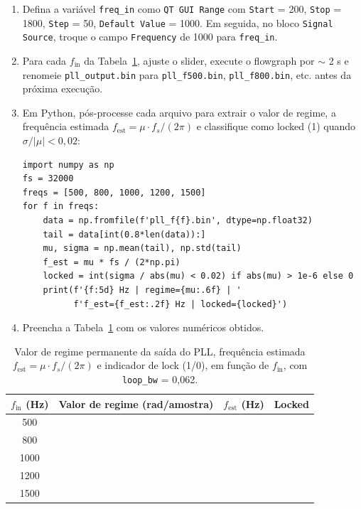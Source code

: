 \documentclass[11pt,a4paper]{article}
\begin{document}
\begin{instrucao}
\begin{enumerate}[label=\arabic*.]
  \item Defina a variável \texttt{freq\_in} como \texttt{QT GUI Range} com
    \texttt{Start} = 200, \texttt{Stop} = 1800, \texttt{Step} = 50,
    \texttt{Default Value} = 1000. Em seguida, no bloco
    \texttt{Signal Source}, troque o campo \texttt{Frequency} de 1000
    para \texttt{freq\_in}.
  \item Para cada $f_\text{in}$ da Tabela~\ref{tab:lock}, ajuste o slider,
    execute o flowgraph por $\sim$ 2 s e renomeie \texttt{pll\_output.bin}
    para \texttt{pll\_f500.bin}, \texttt{pll\_f800.bin}, etc. antes da
    próxima execução.
  \item Em Python, pós-processe cada arquivo para extrair o valor de regime,
    a frequência estimada $f_\text{est} = \mu \cdot f_s/(2\pi)$ e classifique
    como locked (1) quando $\sigma/|\mu| < 0{,}02$:
\begin{verbatim}
import numpy as np
fs = 32000
freqs = [500, 800, 1000, 1200, 1500]
for f in freqs:
    data = np.fromfile(f'pll_f{f}.bin', dtype=np.float32)
    tail = data[int(0.8*len(data)):]
    mu, sigma = np.mean(tail), np.std(tail)
    f_est = mu * fs / (2*np.pi)
    locked = int(sigma / abs(mu) < 0.02) if abs(mu) > 1e-6 else 0
    print(f'{f:5d} Hz | regime={mu:.6f} | '
          f'f_est={f_est:.2f} Hz | locked={locked}')
\end{verbatim}
  \item Preencha a Tabela~\ref{tab:lock} com os valores numéricos obtidos.
\end{enumerate}
\end{instrucao}

\begin{table}[H]
  \centering
  \begin{tabular}{c c c c}
    \toprule
    $f_\text{in}$ (Hz) & Valor de regime (rad/amostra) & $f_\text{est}$ (Hz) & Locked \\
    \midrule
    500  & & & \\
    800  & & & \\
    1000 & & & \\
    1200 & & & \\
    1500 & & & \\
    \bottomrule
  \end{tabular}
  \caption{Valor de regime permanente da saída do PLL, frequência estimada $f_\text{est} = \mu \cdot f_s/(2\pi)$ e indicador de lock (1/0), em função de $f_\text{in}$, com \texttt{loop\_bw} = 0{,}062.}
  \label{tab:lock}
\end{table}
\end{document}
